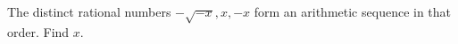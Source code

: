 The distinct rational numbers $-\sqrt{-x},x,-x$ form an arithmetic sequence in that order. Find $x$.
